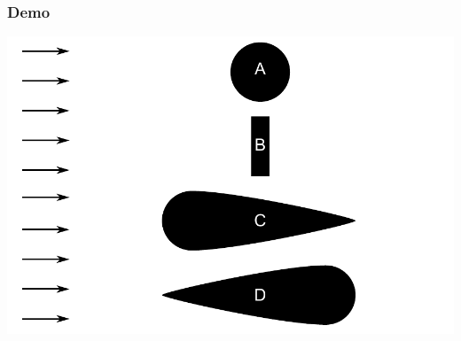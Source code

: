 \documentclass[t]{beamer}
\begin{document}
  	\begin{frame}
		\frametitle{Demo}
		\center
    	\includegraphics[height=0.8\textheight]{fig/uitwendige_stroming/Invloed_van_vorm_op_weerstand}
  	\end{frame}
\end{document}
